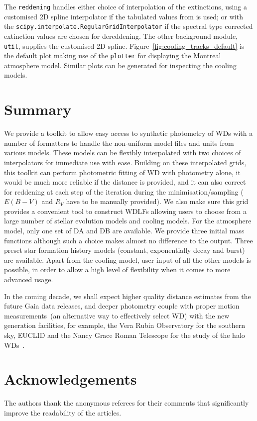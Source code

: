 \documentclass[fleqn,usenatbib]{rasti}
\begin{document}
The \texttt{reddening} handles either choice of interpolation of the
extinctions, using a customised 2D spline interpolator if the tabulated values
from \citet{2011ApJ...737..103S} is used; or with the
\verb+scipy.interpolate.RegularGridInterpolator+ if the spectral type corrected
extinction values are chosen for dereddening. The other background module,
\texttt{util}, supplies the customised 2D spline.
Figure~\ref{fig:cooling_tracks_default} is the default plot making use of the
\texttt{plotter} for displaying the Montreal atmosphere model. Similar
plots can be generated for inspecting the cooling models.

\section{Summary}
We provide a toolkit to allow easy access to synthetic photometry of WDs with
a number of formatters to handle the non-uniform model files and units from
various models. These models can be flexibly interpolated with two choices of
interpolators for immediate use with ease. Building on these interpolated
grids, this toolkit can perform photometric fitting of WD with
photometry alone, it would be much more reliable if the distance is provided, and
it can also correct for reddening at each step of the iteration during the
minimisation/sampling ($E(B-V)$ and $R_V$ have to be manually provided). We
also make sure this grid provides a convenient tool to construct WDLFs
allowing users to choose from a large number of stellar evolution models and
cooling models. For the atmosphere model, only one set of DA and DB are
available. We provide three initial mass functions although such a choice makes
almost no difference to the output. Three preset star formation history
models (constant, exponentially decay and burst) are available. Apart from
the cooling model, user input of all the other models is possible, in order
to allow a high level of flexibility when it comes to more advanced usage.

In the coming decade, we shall expect higher quality distance estimates from
the future Gaia data releases, and deeper photometry couple with proper
motion measurements~(an alternative way to effectively select WD) with the
new generation facilities, for example, the Vera Rubin Observatory for the
southern sky, EUCLID and the Nancy Grace Roman Telescope for the study of the
halo WDs~\citep{2020ApJ...900..139F}.

\section*{Acknowledgements}
The authors thank the anonymous referees for their comments that significantly
improve the readability of the articles.
\end{document}
